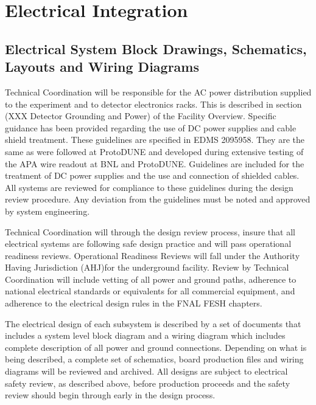



\section{Electrical Integration}
\label{sec:fdsp-Integ-electrical}



\subsection{Electrical System Block Drawings, Schematics, Layouts and Wiring Diagrams}
\label{sec:fdsp-coord-electrical}


Technical Coordination will be responsible for the AC power
distribution supplied to the experiment and to detector electronics
racks.  This is described in section (XXX Detector Grounding and
Power) of the Facility Overview.  Specific guidance has been provided
regarding the use of DC power supplies and cable shield treatment.
These guidelines are specified in EDMS 2095958.  They are the same as
were followed at ProtoDUNE and developed during extensive testing of
the APA wire readout at BNL and ProtoDUNE.  Guidelines are included
for the treatment of DC power supplies and the use and connection of
shielded cables.  All systems are reviewed for compliance to these
guidelines during the design review procedure.  Any deviation from the
guidelines must be noted and approved by system engineering.

Technical Coordination will through the design review process, insure
that all electrical systems are following safe design practice and
will pass operational readiness reviews.  Operational Readiness
Reviews will fall under the Authority Having Jurisdiction (AHJ)for the
underground facility.  Review by Technical Coordination will include
vetting of all power and ground paths, adherence to national
electrical standards or equivalents for all commercial equipment, and
adherence to the electrical design rules in the FNAL FESH chapters.


The electrical design of each subsystem is described by a set of
documents that includes a system level block diagram and a wiring
diagram which includes complete description of all power and ground
connections.  Depending on what is being described, a complete set of
schematics, board production files and wiring diagrams will be
reviewed and archived.  All designs are subject to electrical safety
review, as described above, before production proceeds and the safety
review should begin through  early in the design
process.



